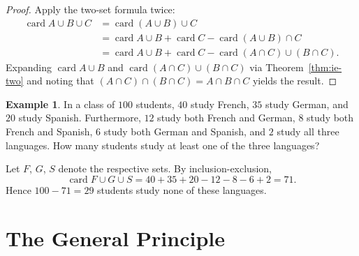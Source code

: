 \documentclass[12pt,a4paper,openany]{book}
\theoremstyle{definition}
\newtheorem{example}[definition]{Example}
\theoremstyle{plain}
\theoremstyle{remark}
\DeclareMathOperator{\card}{card}
\begin{document}
\begin{proof}
Apply the two-set formula twice:
\begin{align*}
  \card{A \cup B \cup C}
  &= \card{(A \cup B) \cup C} \\
  &= \card{A \cup B} + \card{C} - \card{(A \cup B) \cap C} \\
  &= \card{A \cup B} + \card{C} - \card{(A \cap C) \cup (B \cap C)}.
\end{align*}
Expanding $\card{A \cup B}$ and $\card{(A \cap C) \cup (B \cap C)}$ via
Theorem~\ref{thm:ie-two} and noting that
$(A \cap C) \cap (B \cap C) = A \cap B \cap C$ yields the result.
\end{proof}

\begin{center}
\end{center}

\begin{example}\label{ex:ie-languages}
In a class of $100$ students, $40$ study French, $35$ study German, and
$20$ study Spanish.  Furthermore, $12$ study both French and German,
$8$ study both French and Spanish, $6$ study both German and Spanish,
and $2$ study all three languages.  How many students study at least one
of the three languages?

Let $F$, $G$, $S$ denote the respective sets.  By inclusion-exclusion,
\[
  \card{F \cup G \cup S}
  = 40 + 35 + 20 - 12 - 8 - 6 + 2
  = 71.
\]
Hence $100 - 71 = 29$ students study none of these languages.
\end{example}



\section{The General Principle}\label{sec:ie-general}
\end{document}
